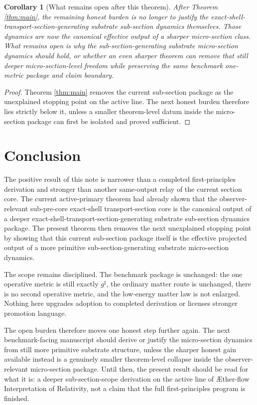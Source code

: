 \documentclass[11pt]{article}
\newcommand{\Aflow}{\AE{}ther-flow}
\newcommand{\TheoryName}{\Aflow{} Interpretation of Relativity}
\newcommand{\CompletedMetric}{g^{\sharp}}
\newtheorem{corollary}{Corollary}
\begin{document}
\begin{corollary}[What remains open after this theorem]
\label{cor:next}
After Theorem \ref{thm:main}, the remaining honest burden is no longer to justify the exact-shell-transport-section-generating substrate sub-section dynamics themselves. Those dynamics are now the canonical effective output of a sharper micro-section class. What remains open is why the sub-section-generating substrate micro-section dynamics should hold, or whether an even sharper theorem can remove that still deeper micro-section-level freedom while preserving the same benchmark one-metric package and claim boundary.
\end{corollary}

\begin{proof}
Theorem \ref{thm:main} removes the current sub-section package as the unexplained stopping point on the active line. The next honest burden therefore lies strictly below it, unless a smaller theorem-level datum inside the micro-section package can first be isolated and proved sufficient.
\end{proof}

\section{Conclusion}

The positive result of this note is narrower than a completed first-principles derivation and stronger than another same-output relay of the current section core. The current active-primary theorem had already shown that the observer-relevant sub-pre-core exact-shell transport-section core is the canonical output of a deeper exact-shell-transport-section-generating substrate sub-section dynamics package. The present theorem then removes the next unexplained stopping point by showing that this current sub-section package itself is the effective projected output of a more primitive sub-section-generating substrate micro-section dynamics.

The scope remains disciplined. The benchmark package is unchanged: the one operative metric is still exactly \(\CompletedMetric\), the ordinary matter route is unchanged, there is no second operative metric, and the low-energy matter law is not enlarged. Nothing here upgrades adoption to completed derivation or licenses stronger promotion language.

The open burden therefore moves one honest step further again. The next benchmark-facing manuscript should derive or justify the micro-section dynamics from still more primitive substrate structure, unless the sharper honest gain available instead is a genuinely smaller theorem-level collapse inside the observer-relevant micro-section package. Until then, the present result should be read for what it is: a deeper sub-section-scope derivation on the active line of \TheoryName{}, not a claim that the full first-principles program is finished.
\end{document}
